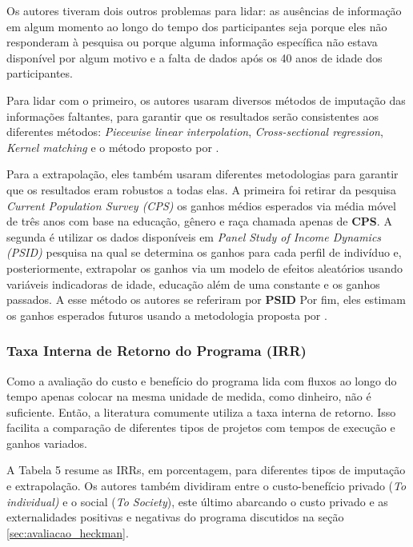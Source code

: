 \documentclass[12pt,letterpaper]{article}
\newcommand{\1}{\mathbbm{1}}
\numberwithin{equation}{section}
\begin{document}
Os autores tiveram dois outros problemas para lidar: as ausências de informação em algum momento ao longo do tempo dos participantes seja porque eles não responderam à pesquisa ou porque alguma informação específica não estava disponível por algum motivo e a falta de dados após os 40 anos de idade dos participantes. 

Para lidar com o primeiro, os autores usaram diversos métodos de imputação das informações faltantes, para garantir que os resultados serão consistentes aos diferentes métodos: \textit{Piecewise linear interpolation}, \textit{Cross-sectional regression}, \textit{Kernel matching} e o método proposto por \cite{hause1980fine}. 

Para a extrapolação, eles também usaram diferentes metodologias para garantir que os resultados eram robustos a todas elas. A primeira foi retirar da pesquisa \textit{Current Population Survey (CPS)} os ganhos médios esperados via média móvel de três anos com base na educação, gênero e raça chamada apenas de \textbf{CPS}. A segunda é utilizar os dados disponíveis em \textit{Panel Study of Income Dynamics (PSID)} pesquisa na qual se determina os ganhos para cada perfil de indivíduo e, posteriormente, extrapolar os ganhos via um modelo de efeitos aleatórios usando variáveis indicadoras de idade, educação além de uma constante e os ganhos passados. A esse método os autores se referiram por \textbf{PSID} Por fim, eles estimam os ganhos esperados futuros usando a metodologia proposta por \cite{hause1980fine}.

\subsubsection{Taxa Interna de Retorno do Programa (IRR)}

Como a avaliação do custo e benefício do programa lida com fluxos ao longo do tempo apenas colocar na mesma unidade de medida, como dinheiro, não é suficiente. Então, a literatura comumente utiliza a taxa interna de retorno. Isso facilita a comparação de diferentes tipos de projetos com tempos de execução e ganhos variados. 

A Tabela 5 resume as IRRs, em porcentagem, para diferentes tipos de imputação e extrapolação. Os autores também dividiram entre o custo-benefício privado (\textit{To individual)} e o social (\textit{To Society}), este último abarcando o custo privado e as externalidades positivas e negativas do programa discutidos na seção \ref{sec:avaliacao_heckman}.
\end{document}
